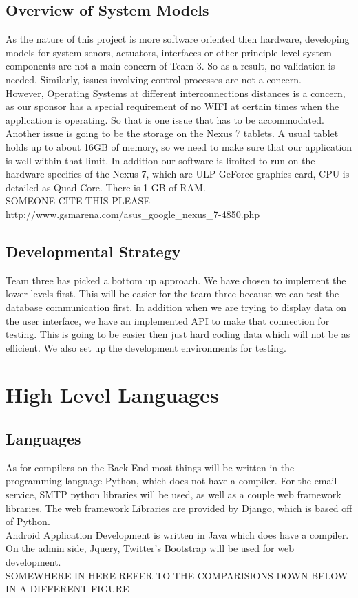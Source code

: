 \documentclass[Letter,11pt]{article}
\begin{document}
	\subsection{Overview of System Models}
	As the nature of this project is more software oriented then hardware, developing models for system senors, actuators, interfaces or other principle level system components are not a main concern of Team 3. So as a result, no validation is needed. Similarly, issues involving control processes are not a concern. \\
	However, Operating Systems at different interconnections distances is a concern, as our sponsor has a special requirement of no WIFI at certain times when the application is operating. So that is one issue that has to be accommodated. Another issue is going to be the storage on the Nexus 7 tablets. A usual tablet holds up to about 16GB of memory, so we need to make sure that our application is well within that limit.  In addition our software is limited to run on the hardware specifics of the Nexus 7, which are ULP GeForce graphics card, CPU is detailed as Quad Core. There is 1 GB of RAM.   \\
	
	SOMEONE CITE THIS PLEASE http://www.gsmarena.com/asus_google_nexus_7-4850.php \\
	
	\subsection{Developmental Strategy}
	Team three has picked a bottom up approach. We have chosen to implement the lower levels first. This will be easier for the team three because we can test the database communication first. In addition when we are trying to display data on the user interface, we have an implemented API to make that connection for testing. This is going to be easier then just hard coding data which will not be as efficient.  We also set up the development environments for testing. 

\section{High Level Languages}\label{highlevel}
	\subsection{Languages}
	As for compilers on the Back End most things will be written in the programming language Python, which does not have a compiler. For the email service, SMTP python libraries will be used, as well as a couple web framework libraries. The web framework Libraries are provided by Django, which is based off of Python. \\
	Android Application Development is written in Java which does have a compiler. On the admin side, Jquery, Twitter's Bootstrap will be used for web development.   \\ SOMEWHERE IN HERE REFER TO THE COMPARISIONS DOWN BELOW IN A DIFFERENT FIGURE
\end{document}
